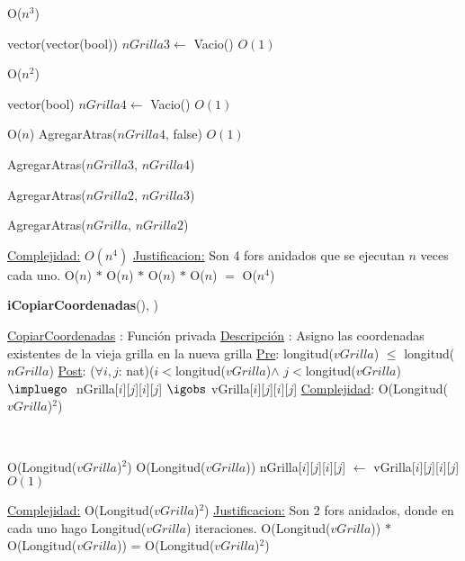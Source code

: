 \begin{Algoritmos}
\begin{algorithm}[H]
\begin{algorithmic}[1]
	  \Comment O($n^3$)
	
		\State vector(vector(bool)) $nGrilla3 \gets$ Vacio()   \Comment $O(1)$
		
		  \Comment O($n^2$)

			\State vector(bool) $nGrilla4 \gets$ Vacio() \Comment $O(1)$
			
			   \Comment O($n$)
			 	\State AgregarAtras($nGrilla4$, false) \Comment $O(1)$			 	
			 \EndFor		
			 
			 \State AgregarAtras($nGrilla3$, $nGrilla4$)
		
		\EndFor
		
		\State AgregarAtras($nGrilla2$, $nGrilla3$)
	
	\EndFor
	
	\State AgregarAtras($nGrilla$, $nGrilla2$)


\EndFor

\medskip
\Statex \underline{Complejidad:} $O(n^4)$
\Statex \underline{Justificacion:} Son 4 fors anidados que se ejecutan $n$ veces cada uno. O($n$) $*$ O($n$) $*$ O($n$) $*$ O($n$) $=$  O($n^4$)
 
\end{algorithmic}
\end{algorithm}



\begin{algorithm}[H]
{\textbf{iCopiarCoordenadas}(), )}
\begin{algorithmic}[1]

\Statex \underline{CopiarCoordenadas} : Funci\'on privada 
\Statex \underline{Descripci\'on} : Asigno las coordenadas existentes de la vieja grilla en la nueva grilla
\Statex \underline{Pre}: longitud($vGrilla$) $\leq$ longitud($nGrilla$)
\Statex \underline{Post}: ($\forall i, j$: nat)($i < $longitud($vGrilla$)$ \land$ $j < $longitud($vGrilla$) $\impluego$
\Statex $ $\hspace*{2cm} nGrilla[$i$][$j$][$i$][$j$] $\igobs$ vGrilla[$i$][$j$][$i$][$j$]
\Statex \underline{Complejidad}: O(Longitud($vGrilla$)$^2$) 

\Statex $ $
\Statex $ $

  \Comment O(Longitud($vGrilla$)$^2$)
	  \Comment O(Longitud($vGrilla$))
		\State nGrilla[$i$][$j$][$i$][$j$] $\gets$ vGrilla[$i$][$j$][$i$][$j$] \Comment $O(1)$
	\EndFor
\EndFor


\medskip
\Statex \underline{Complejidad:}  \Comment O(Longitud($vGrilla$)$^2$)
\Statex \underline{Justificacion:} Son 2 fors anidados, donde en cada uno hago Longitud($vGrilla$) iteraciones. O(Longitud($vGrilla$)) $*$ O(Longitud($vGrilla$)) = O(Longitud($vGrilla$)$^2$)
\end{algorithmic}
\end{algorithm}

  
\end{Algoritmos}